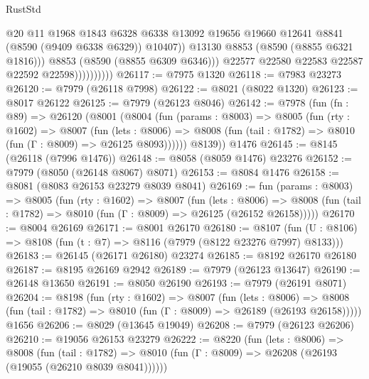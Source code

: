 \begin{lexlean}{RustStd}
\begin{coremodule}
                                @20
                                @11
                                @1968
                                @1843
                                @6328
                                @6338
                                @13092
                                @19656
                                @19660
                                @12641
                                @8841
                                (@8590 (@9409 @6338 @6329))
                                @10407))
                            @13130
                            @8853
                            (@8590 (@8855 @6321 @1816)))
                          @8853
                          (@8590 (@8855 @6309 @6346)))
                        @22577
                        @22580
                        @22583
                        @22587
                        @22592
                        @22598))))))))))
@26117 := @7975 @1320
@26118 := @7983 @23273
@26120 := @7979 (@26118 @7998)
@26122 := @8021 (@8022 @1320)
@26123 := @8017 @26122
@26125 := @7979 (@26123 @8046)
@26142 := @7978
    (fun (fn : @89) =>
    @26120
      (@8001
        (@8004
          (fun (params : @8003) =>
          @8005
            (fun (rty : @1602) =>
            @8007
              (fun (lets : @8006) =>
              @8008 (fun (tail : @1782) => @8010 (fun (Γ : @8009) => @26125 @8093))))))
        @8139))
    @1476
@26145 := @8145 (@26118 (@7996 @1476))
@26148 := @8058 (@8059 @1476) @23276
@26152 := @7979 (@8050 (@26148 @8067) @8071)
@26153 := @8084 @1476
@26158 := @8081 (@8083 @26153 @23279 @8039 @8041)
@26169 := fun (params : @8003) =>
  @8005
    (fun (rty : @1602) =>
    @8007
      (fun (lets : @8006) =>
      @8008 (fun (tail : @1782) => @8010 (fun (Γ : @8009) => @26125 (@26152 @26158)))))
@26170 := @8004 @26169
@26171 := @8001 @26170
@26180 := @8107
    (fun (U : @8106) => @8108 (fun (t : @7) => @8116 (@7979 (@8122 @23276 @7997) @8133)))
@26183 := @26145 (@26171 @26180) @23274
@26185 := @8192 @26170 @26180
@26187 := @8195 @26169 @2942
@26189 := @7979 (@26123 @13647)
@26190 := @26148 @13650
@26191 := @8050 @26190
@26193 := @7979 (@26191 @8071)
@26204 := @8198
    (fun (rty : @1602) =>
    @8007
      (fun (lets : @8006) =>
      @8008 (fun (tail : @1782) => @8010 (fun (Γ : @8009) => @26189 (@26193 @26158)))))
    @1656
@26206 := @8029 (@13645 @19049)
@26208 := @7979 (@26123 @26206)
@26210 := @19056 @26153 @23279
@26222 := @8220
    (fun (lets : @8006) =>
    @8008
      (fun (tail : @1782) =>
      @8010 (fun (Γ : @8009) => @26208 (@26193 (@19055 (@26210 @8039 @8041))))))

\end{coremodule}
\end{lexlean}

